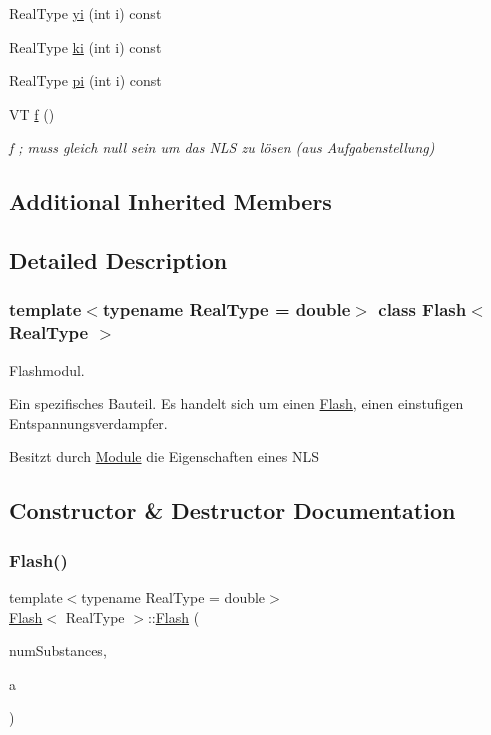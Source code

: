 \begin{DoxyCompactItemize}
\item 
Real\+Type \mbox{\hyperlink{class_flash_a79622eee2bd4ec63c7d04c50603119a0}{yi}} (int i) const
\item 
Real\+Type \mbox{\hyperlink{class_flash_ae7582896021d0734356b1b5253ac68f1}{ki}} (int i) const
\item 
Real\+Type \mbox{\hyperlink{class_flash_a7a00a2495097cc7d45ee1f61b512829d}{pi}} (int i) const
\item 
VT \mbox{\hyperlink{class_flash_abd6eed865f215c9b4633547f154e91ec}{f}} ()
\begin{DoxyCompactList}\small\item\em f ; muss gleich null sein um das N\+LS zu lösen (aus Aufgabenstellung) \end{DoxyCompactList}\end{DoxyCompactItemize}
\subsection*{Additional Inherited Members}


\subsection{Detailed Description}
\subsubsection*{template$<$typename Real\+Type = double$>$\newline
class Flash$<$ Real\+Type $>$}

Flashmodul. 

Ein spezifisches Bauteil. Es handelt sich um einen \mbox{\hyperlink{class_flash}{Flash}}, einen einstufigen Entspannungsverdampfer.

Besitzt durch \mbox{\hyperlink{class_module}{Module}} die Eigenschaften eines N\+LS 

\subsection{Constructor \& Destructor Documentation}
\mbox{\label{class_flash_abd6d1b3833826823dceb861c1da31b71}} 
\subsubsection{\texorpdfstring{Flash()}{Flash()}\hspace{0.1cm}{\footnotesize\ttfamily [1/2]}}
{\footnotesize\ttfamily template$<$typename Real\+Type = double$>$ \\
\mbox{\hyperlink{class_flash}{Flash}}$<$ Real\+Type $>$\+::\mbox{\hyperlink{class_flash}{Flash}} (\begin{DoxyParamCaption}\item[{int}]{num\+Substances,  }\item[{Matrix$<$ Real\+Type, Dynamic, 7 $>$}]{a }\end{DoxyParamCaption})\hspace{0.3cm}{\ttfamily [inline]}}



